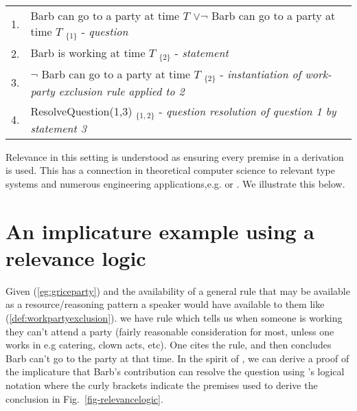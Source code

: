 \documentclass[11pt,a4paper]{article}
\theoremstyle{definition}
\begin{document}
\begin{figure*}[!t]
    \centering
    \begin{tabular}{ll}
         1. & Barb can go to a party at time $T$ $\lor \neg$ Barb can go to a party at time $T$ $_{\{1\}}$ - \textit{question} \\
         2. & Barb is working at time $T$ $_{\{2\}}$ - \textit{statement} \\
         \hline
         3. & $\neg$ Barb can go to a party at time $T$ $_{\{2\}}$ - \textit{instantiation of work-party exclusion rule applied to 2} \\

        4. & ResolveQuestion(1,3) $_{\{1,2\}}$ - \textit{question resolution of question 1 by statement 3}
         
    \end{tabular}
    \caption{Deriving an implicated answer to a question by Relevance Logic proof.}
    \label{fig-relevancelogic}
\end{figure*}





Relevance in this setting is understood as ensuring every premise in a derivation is used. This has a connection in theoretical computer science to relevant type systems \cite{walker2005substructural} and numerous engineering applications,e.g. \cite{cheng2004temporal} or \cite{Bruns:2011:ACV:1952982.1952991}. We illustrate this below. 

\section{An implicature example using a relevance logic}
Given (\ref{eg:griceparty}) and the availability of a general rule that may be available as a resource/reasoning pattern a speaker would have available to them like (\ref{def:workpartyexclusion}). we have rule which tells us when someone is working they can't attend a party (fairly reasonable consideration for most, unless one works in e.g catering, clown acts, etc). One cites the rule, and then concludes Barb can't go to the party at that time. In the spirit of \cite{Breitholtz2014}, we can derive a proof of the implicature that Barb's contribution can resolve the question using \cite{Mares2004}'s logical notation where the curly brackets indicate the premises used to derive the conclusion in Fig.~\ref{fig-relevancelogic}.
\end{document}
